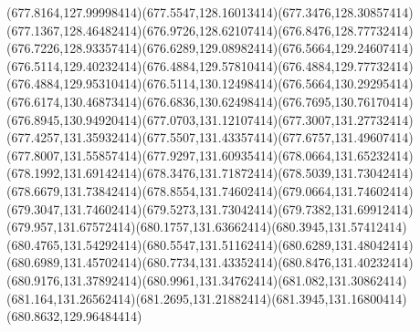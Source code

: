 {{	\curveto(677.8164,127.99998414)(677.5547,128.16013414)(677.3476,128.30857414)
	\curveto(677.1367,128.46482414)(676.9726,128.62107414)(676.8476,128.77732414)
	\curveto(676.7226,128.93357414)(676.6289,129.08982414)(676.5664,129.24607414)
	\curveto(676.5114,129.40232414)(676.4884,129.57810414)(676.4884,129.77732414)
	\curveto(676.4884,129.95310414)(676.5114,130.12498414)(676.5664,130.29295414)
	\curveto(676.6174,130.46873414)(676.6836,130.62498414)(676.7695,130.76170414)
	\curveto(676.8945,130.94920414)(677.0703,131.12107414)(677.3007,131.27732414)
	\curveto(677.4257,131.35932414)(677.5507,131.43357414)(677.6757,131.49607414)
	\curveto(677.8007,131.55857414)(677.9297,131.60935414)(678.0664,131.65232414)
	\curveto(678.1992,131.69142414)(678.3476,131.71872414)(678.5039,131.73042414)
	\curveto(678.6679,131.73842414)(678.8554,131.74602414)(679.0664,131.74602414)
	\curveto(679.3047,131.74602414)(679.5273,131.73042414)(679.7382,131.69912414)
	\curveto(679.957,131.67572414)(680.1757,131.63662414)(680.3945,131.57412414)
	\curveto(680.4765,131.54292414)(680.5547,131.51162414)(680.6289,131.48042414)
	\curveto(680.6989,131.45702414)(680.7734,131.43352414)(680.8476,131.40232414)
	\curveto(680.9176,131.37892414)(680.9961,131.34762414)(681.082,131.30862414)
	\curveto(681.164,131.26562414)(681.2695,131.21882414)(681.3945,131.16800414)
	\closepath
	\moveto(680.8632,129.96484414)
}
}

{
}

